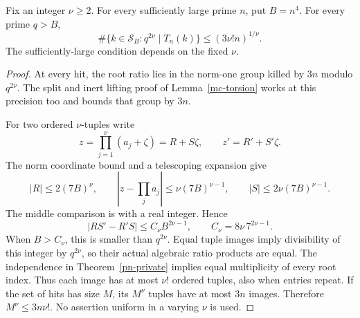 \begin{theorem}\label{pn-moment}
Fix an integer \(\nu\geq2\). For every sufficiently large prime
\(n\), put \(B=n^4\). For every prime \(q>B\),
\[
 \#\{k\in\mathcal{S}_B:q^{2\nu}\mid T_n(k)\}
             \leq(3\nu!n)^{1/\nu}.
\]
The sufficiently-large condition depends on the fixed \(\nu\).
\end{theorem}
\begin{proof}
At every hit, the root ratio lies in the norm-one group killed by
\(3n\) modulo \(q^{2\nu}\).
The split and inert lifting proof of Lemma~\ref{mc-torsion}
works at this precision too and bounds that group by \(3n\).

For two ordered \(\nu\)-tuples write
\[
 z=\prod_{j=1}^{\nu}(a_j+\zeta)=R+S\zeta,\qquad
 z'=R'+S'\zeta.
\]
The norm coordinate bound and a telescoping expansion give
\[
 |R|\leq2(7B)^\nu,\qquad
 \left|z-\prod_j a_j\right|\leq\nu(7B)^{\nu-1},
 \qquad |S|\leq2\nu(7B)^{\nu-1}.
\]
The middle comparison is with a real integer. Hence
\[
 |RS'-R'S|\leq C_\nu B^{2\nu-1},\qquad
 C_\nu=8\nu\,7^{2\nu-1}.
\]
When \(B>C_\nu\), this is smaller than \(q^{2\nu}\).
Equal tuple images imply divisibility of this integer by
\(q^{2\nu}\), so their actual algebraic ratio products are equal.
The independence in Theorem~\ref{pn-private} implies equal
multiplicity of every root index. Thus each image has at most
\(\nu!\) ordered tuples, also when entries repeat.
If the set of hits has size \(M\), its \(M^\nu\) tuples have at
most \(3n\) images. Therefore \(M^\nu\leq3n\nu!\).
No assertion uniform in a varying \(\nu\) is used.
\end{proof}

